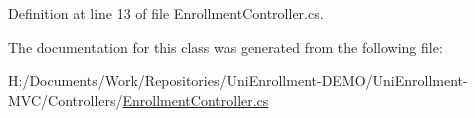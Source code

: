 Definition at line 13 of file Enrollment\+Controller.\+cs.



The documentation for this class was generated from the following file\+:\begin{DoxyCompactItemize}
\item 
H\+:/\+Documents/\+Work/\+Repositories/\+Uni\+Enrollment-\/\+D\+E\+M\+O/\+Uni\+Enrollment-\/\+M\+V\+C/\+Controllers/\hyperlink{_enrollment_controller_8cs}{Enrollment\+Controller.\+cs}\end{DoxyCompactItemize}
